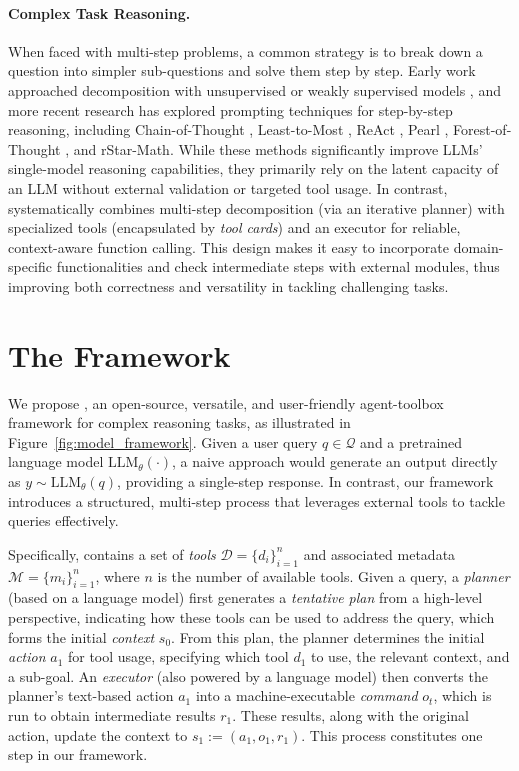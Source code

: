 \paragraph{Complex Task Reasoning.}
When faced with multi-step problems, a common strategy is to break down a question into simpler sub-questions and solve them step by step. Early work approached decomposition with unsupervised or weakly supervised models \citep{perez2020unsupervised, khot2022decomposed}, and more recent research has explored prompting techniques for step-by-step reasoning, including Chain-of-Thought \citep{wei2022chain}, Least-to-Most \citep{zhou2022least}, ReAct \citep{yao2022react}, Pearl \citep{sun2023pearl}, Forest-of-Thought \citep{bi2024forest}, and rStar-Math\citep{guan2025rstar}. While these methods significantly improve LLMs’ single-model reasoning capabilities, they primarily rely on the latent capacity of an LLM without external validation or targeted tool usage. In contrast, \model systematically combines multi-step decomposition (via an iterative planner) with specialized tools (encapsulated by \emph{tool cards}) and an executor for reliable, context-aware function calling. This design makes it easy to incorporate domain-specific functionalities and check intermediate steps with external modules, thus improving both correctness and versatility in tackling challenging tasks.


\section{The \model Framework}
\label{sec:system}

We propose \model, an open-source, versatile, and user-friendly agent-toolbox framework for  complex reasoning tasks, as illustrated in Figure~\ref{fig:model_framework}. 
Given a user query $q \in \mathcal{Q}$ and a pretrained language model $\text{LLM}_\theta(\cdot)$, a naive approach would generate an output directly as $y \sim \text{LLM}_\theta(q)$, providing a single-step response. In contrast, our \model framework introduces a structured, multi-step process that leverages external tools to tackle queries effectively.

Specifically, \model contains a set of \textit{tools} $\mathcal{D} = \{d_i\}_{i=1}^n$ and associated metadata $\mathcal{M} = \{m_i\}_{i=1}^n$, where $n$ is the number of available tools. Given a query, a \textit{planner} (based on a language model) first generates a \textit{tentative plan} from a high-level perspective, indicating how these tools can be used to address the query, which forms the initial \textit{context} $s_0$. From this plan, the planner determines the initial \textit{action} $a_1$ for tool usage, specifying which tool $d_1$ to use, the relevant context, and a sub-goal. An \textit{executor} (also powered by a language model) then converts the planner’s text-based action $a_1$ into a machine-executable \textit{command} $o_t$, which is run to obtain intermediate results $r_1$. These results, along with the original action, update the context to $s_1 := (a_1, o_1, r_1)$. This process constitutes one step in our framework.

